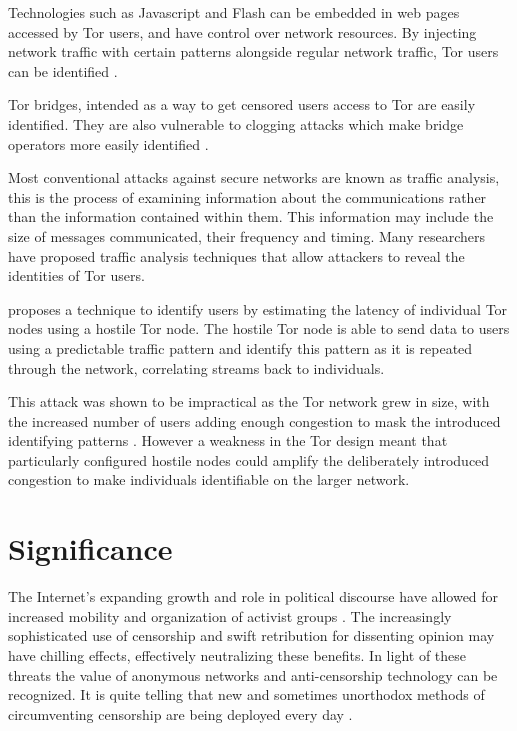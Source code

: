 \documentclass{ecuthesis}
\begin{document}
Technologies such as Javascript and Flash can be embedded in web pages accessed
by Tor users, and have control over network resources. By injecting network
traffic with certain patterns alongside regular network traffic, Tor users can
be identified \parencite{Abbott:2007p298}.

Tor bridges, intended as a way to get censored users access to Tor are easily
identified. They are also vulnerable to clogging attacks which make bridge
operators more easily identified \textcite{McLachlan:2009p197}. 

Most conventional attacks against secure networks are known as traffic analysis,
this is the process of examining information about the communications rather
than the information contained within them. This information may include the
size of messages communicated, their frequency and timing. Many researchers have
proposed traffic analysis techniques that allow attackers to reveal the
identities of Tor users. 

\textcite{Murdoch:2005p325} proposes a technique to identify users by estimating
the latency of individual Tor nodes using a hostile Tor node. The hostile Tor
node is able to send data to users using a predictable traffic pattern and
identify this pattern as it is repeated through the network, correlating streams
back to individuals.

This attack was shown to be impractical as the Tor network grew in size, with 
the increased number of users adding enough congestion to mask the introduced
identifying patterns \parencite{Evans:2009p315}. However a weakness in the Tor
design meant that particularly configured hostile nodes could amplify the
deliberately introduced congestion to make individuals identifiable on the
larger network.

\section{Significance}

The Internet's expanding growth \parencite{Miniwatts-Marketing-Group:2010uq} and
role in political discourse \parencite{Bonchek:1997p3455} have allowed for
increased mobility and organization of activist groups
\parencite{Alexander:2011kx,Anderson:2011vn}. The increasingly sophisticated use
of censorship \parencite{Crandall:2007p6165,Karlin:2009p6166} and swift
retribution for dissenting opinion
\parencite{website:china-yahoo-torture,website:vietnam-bloggers-arrested,website:egypt-arrests,website:blogger-arrests}
may have chilling effects, effectively neutralizing these benefits. In light of
these threats the value of anonymous networks and anti-censorship technology can
be recognized. It is quite telling that new and sometimes unorthodox methods of
circumventing censorship are being deployed every day
\parencite{The-Economist:2011fk,Brading:2011ys}.
\end{document}
